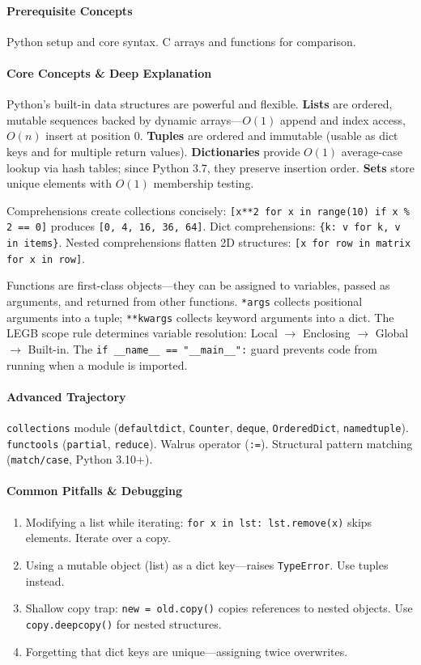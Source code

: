 \documentclass[11pt, a4paper, oneside]{report}
\newcommand{\arrow}{$\rightarrow$}
\begin{document}
\paragraph{Prerequisite Concepts} Python setup and core syntax. C arrays and functions for comparison.

\paragraph{Core Concepts \& Deep Explanation} Python's built-in data structures are powerful and flexible. \textbf{Lists} are ordered, mutable sequences backed by dynamic arrays---$O(1)$ append and index access, $O(n)$ insert at position 0. \textbf{Tuples} are ordered and immutable (usable as dict keys and for multiple return values). \textbf{Dictionaries} provide $O(1)$ average-case lookup via hash tables; since Python 3.7, they preserve insertion order. \textbf{Sets} store unique elements with $O(1)$ membership testing.

Comprehensions create collections concisely: \texttt{[x**2 for x in range(10) if x \% 2 == 0]} produces \texttt{[0, 4, 16, 36, 64]}. Dict comprehensions: \texttt{\{k: v for k, v in items\}}. Nested comprehensions flatten 2D structures: \texttt{[x for row in matrix for x in row]}.

Functions are first-class objects---they can be assigned to variables, passed as arguments, and returned from other functions. \texttt{*args} collects positional arguments into a tuple; \texttt{**kwargs} collects keyword arguments into a dict. The LEGB scope rule determines variable resolution: Local \arrow{} Enclosing \arrow{} Global \arrow{} Built-in. The \texttt{if \_\_name\_\_ == "\_\_main\_\_":} guard prevents code from running when a module is imported.

\paragraph{Advanced Trajectory} \texttt{collections} module (\texttt{defaultdict}, \texttt{Counter}, \texttt{deque}, \texttt{OrderedDict}, \texttt{namedtuple}). \texttt{functools} (\texttt{partial}, \texttt{reduce}). Walrus operator (\texttt{:=}). Structural pattern matching (\texttt{match/case}, Python 3.10+).

\paragraph{Common Pitfalls \& Debugging}
\begin{enumerate}[leftmargin=*]
\item Modifying a list while iterating: \texttt{for x in lst: lst.remove(x)} skips elements. Iterate over a copy.
\item Using a mutable object (list) as a dict key---raises \texttt{TypeError}. Use tuples instead.
\item Shallow copy trap: \texttt{new = old.copy()} copies references to nested objects. Use \texttt{copy.deepcopy()} for nested structures.
\item Forgetting that dict keys are unique---assigning twice overwrites.
\end{enumerate}
\end{document}
